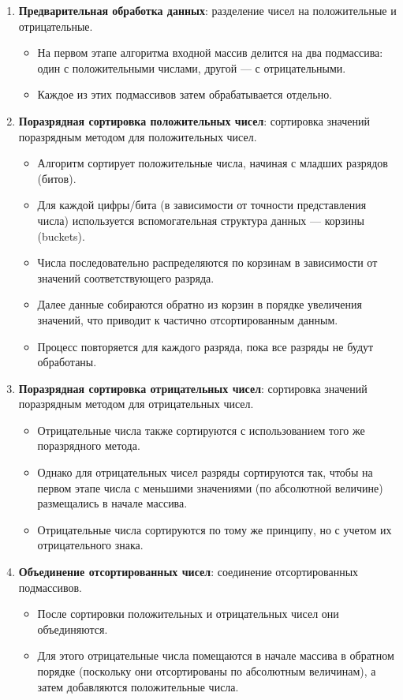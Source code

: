 \documentclass[12pt]{article}
\begin{document}
\begin{enumerate} \item \textbf{Предварительная обработка данных}: разделение чисел на положительные и отрицательные. \begin{itemize} \item На первом этапе алгоритма входной массив делится на два подмассива: один с положительными числами, другой — с отрицательными. \item Каждое из этих подмассивов затем обрабатывается отдельно. \end{itemize}
\item \textbf{Поразрядная сортировка положительных чисел}: сортировка значений поразрядным методом для положительных чисел.
\begin{itemize}
    \item Алгоритм сортирует положительные числа, начиная с младших разрядов (битов).
    \item Для каждой цифры/бита (в зависимости от точности представления числа) используется вспомогательная структура данных — корзины (buckets).
    \item Числа последовательно распределяются по корзинам в зависимости от значений соответствующего разряда.
    \item Далее данные собираются обратно из корзин в порядке увеличения значений, что приводит к частично отсортированным данным.
    \item Процесс повторяется для каждого разряда, пока все разряды не будут обработаны.
\end{itemize}

\item \textbf{Поразрядная сортировка отрицательных чисел}: сортировка значений поразрядным методом для отрицательных чисел.
\begin{itemize}
    \item Отрицательные числа также сортируются с использованием того же поразрядного метода.
    \item Однако для отрицательных чисел разряды сортируются так, чтобы на первом этапе числа с меньшими значениями (по абсолютной величине) размещались в начале массива.
    \item Отрицательные числа сортируются по тому же принципу, но с учетом их отрицательного знака.
\end{itemize}

\item \textbf{Объединение отсортированных чисел}: соединение отсортированных подмассивов.
\begin{itemize}
    \item После сортировки положительных и отрицательных чисел они объединяются.
    \item Для этого отрицательные числа помещаются в начале массива в обратном порядке (поскольку они отсортированы по абсолютным величинам), а затем добавляются положительные числа.
\end{itemize}


\end{enumerate}
\end{document}
